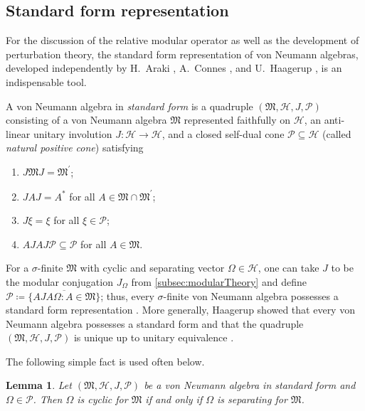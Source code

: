 \documentclass[a4paper, twoside, 11pt, reqno]{amsart}
\theoremstyle{definition}
\theoremstyle{plain}
\newtheorem{lemma}[definition]{Lemma}
\renewcommand{\subset}{\subseteq}
\renewcommand{\Omega}{\varOmega}
\newcommand{\MH}{\mathcal{H}}
\newcommand{\MFM}{\mathfrak{M}}
\newcommand{\comm}[1]{#1^{\prime}}
\newcommand{\NPC}{\mathcal{P}}
\newcommand{\1}{\mathbf{1}}
\newcommand{\set}[2][]{#1\{{#2}#1\}}
\newcommand{\ce}{\coloneqq}
\newcommand{\oln}[1]{\overline{#1}}
\begin{document}
\subsection{Standard form representation}\label{subsec:standardForm}

For the discussion of the relative modular operator as well as the development of perturbation theory, the standard form representation of von Neumann algebras, developed independently by H.~Araki \cite{Araki1974}, A.~Connes \cite{Connes1974}, and U.~Haagerup \cite{Haagerup1975}, is an indispensable tool.

A von Neumann algebra in \emph{standard form} is a quadruple $(\MFM, \MH, J, \NPC)$ consisting of a von Neumann algebra $\MFM$ represented faithfully on $\MH$, an anti-linear unitary involution $J : \MH \to \MH$, and a closed self-dual cone $\NPC \subset \MH$ (called \emph{natural positive cone}) satisfying
\begin{enumerate}
    \item \label{enu:standardFormTomita} $J \MFM J = \comm{\MFM}$;
    \item \label{enu:standardFormJCenter} $J A J = A^\ast$ for all $A \in \MFM \cap \comm{\MFM}$;
    \item \label{enu:standardFormJIdentityNPC} $J \xi = \xi$ for all $\xi \in \NPC$;
    \item \label{enu:standardFormJConjugationNPC} $AJAJ \NPC \subset \NPC$ for all $A \in \MFM$.
\end{enumerate}

For a $\sigma$-finite $\MFM$ with cyclic and separating vector $\Omega \in \MH$, one can take $J$ to be the modular conjugation $J_\Omega$ from \cref{subsec:modularTheory} and define $\NPC \ce \oln{\set{A J A \Omega : A \in \MFM}}$; thus, every $\sigma$-finite von Neumann algebra possesses a standard form representation \cite[Thm. 3.2]{Hiai2021}. More generally, Haagerup \cite{Haagerup1975} showed that every von Neumann algebra possesses a standard form and that the quadruple $(\MFM, \MH, J, \NPC)$ is unique up to unitary equivalence \cite[Sect. 10.26]{StratilaZsido2019}.

The following simple fact \cite[Lem. 3.9]{Hiai2021} is used often below.

\begin{lemma}\label{lem:cyclicSeparating}
    Let $(\MFM, \MH, J, \NPC)$ be a von Neumann algebra in standard form and $\Omega \in \NPC$. Then $\Omega$ is cyclic for $\MFM$ if and only if $\Omega$ is separating for $\MFM$.
\end{lemma}
\end{document}
